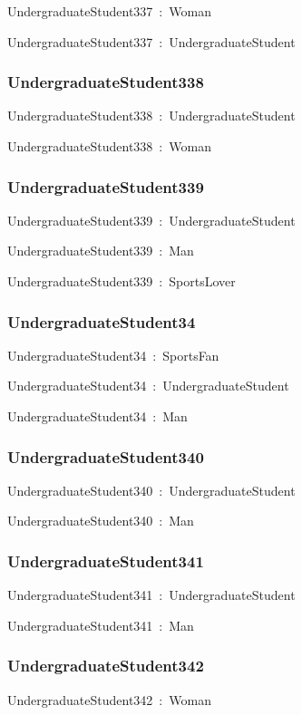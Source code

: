 \documentclass{article}
\begin{document}
UndergraduateStudent337~:~Woman

UndergraduateStudent337~:~UndergraduateStudent

\subsubsection*{UndergraduateStudent338}

UndergraduateStudent338~:~UndergraduateStudent

UndergraduateStudent338~:~Woman

\subsubsection*{UndergraduateStudent339}

UndergraduateStudent339~:~UndergraduateStudent

UndergraduateStudent339~:~Man

UndergraduateStudent339~:~SportsLover

\subsubsection*{UndergraduateStudent34}

UndergraduateStudent34~:~SportsFan

UndergraduateStudent34~:~UndergraduateStudent

UndergraduateStudent34~:~Man

\subsubsection*{UndergraduateStudent340}

UndergraduateStudent340~:~UndergraduateStudent

UndergraduateStudent340~:~Man

\subsubsection*{UndergraduateStudent341}

UndergraduateStudent341~:~UndergraduateStudent

UndergraduateStudent341~:~Man

\subsubsection*{UndergraduateStudent342}

UndergraduateStudent342~:~Woman
\end{document}
